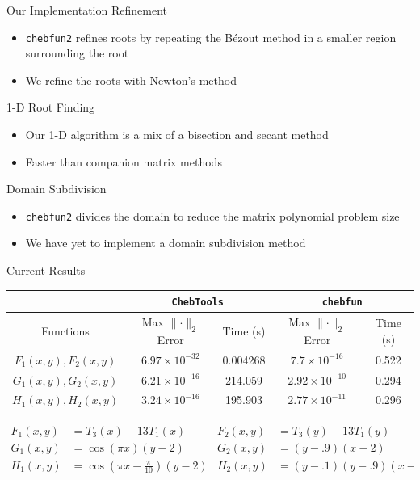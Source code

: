 \documentclass[final]{beamer}
\begin{document}
\begin{frame}{}
\begin{columns}[t]
\begin{column}{.31\linewidth}
\begin{block}{Our Implementation}
{\color{numhypRed} Refinement}\\
\begin{itemize}
\item {\tt chebfun2} refines roots by repeating the B\'{e}zout method in a smaller region surrounding the root \cite[Sec.\ 7]{nakatsukasa_2013}
\item We refine the roots with Newton's method
\end{itemize}
{\color{numhypRed} 1-D Root Finding}\\
\begin{itemize}
\item Our 1-D algorithm is a mix of a bisection and secant method
\item Faster than companion matrix methods \cite{boyd_2013}
\end{itemize}
{\color{numhypRed} Domain Subdivision}\\
\begin{itemize}
\item {\tt chebfun2} divides the domain to reduce the matrix polynomial problem size \cite[Sec.\ 4]{nakatsukasa_2013}
\item We have yet to implement a domain subdivision method
\end{itemize}
\end{block}
\begin{block}{Current Results}
\begin{tabular}{ |c|c|c|c|c|  }
 \hline
 & \multicolumn{2}{|c|}{{\tt ChebTools}}&\multicolumn{2}{|c|}{{\tt chebfun}} \\
 \hline
 Functions							& Max $\lVert\cdot\rVert_2$ Error 	& Time (s)	& Max $\lVert\cdot\rVert_2$ Error	& Time (s)\\
 \hline
 $F_1(x,y),F_2(x,y)$ & $6.97\times10^{-32}$&0.004268 &$7.7\times10^{-16}$ &0.522 \\
 \hline
 $G_1(x,y),G_2(x,y)$ & $6.21\times10^{-16}$ & 214.059 &$2.92\times10^{-10}$ &0.294 \\
 \hline
 $H_1(x,y),H_2(x,y)$ &$3.24\times10^{-16}$ & 195.903 &$2.77\times10^{-11}$ &0.296 \\
 \hline
\end{tabular}
\begin{align*}
F_1(x,y) &= T_3(x)-13T_1(x) & F_2(x,y) &= T_3(y)-13T_1(y)\\
G_1(x,y) &= \cos(\pi x)(y-2) & G_2(x,y) &= (y-.9)(x-2)\\
H_1(x,y) &= \cos\left(\pi x-\frac{\pi}{10}\right)(y-2) & H_2(x,y) &= (y-.1)(y-.9)(x-2)

\end{align*}
\end{block}
\end{column}
\end{columns}
\end{frame}
\end{document}
